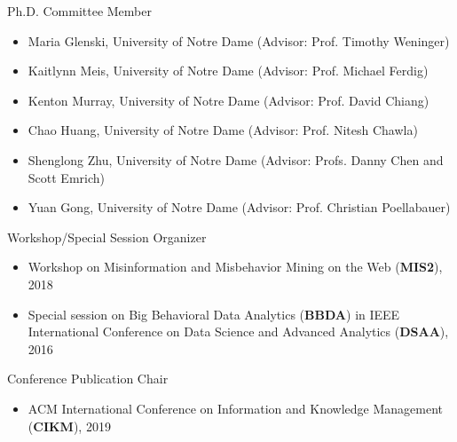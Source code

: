 \documentclass[margin, 9pt]{res}
\begin{document}
\begin{resume}
{Ph.D. Committee Member}
\begin{itemize}
\item Maria Glenski, University of Notre Dame (Advisor: Prof. Timothy Weninger)
\item Kaitlynn Meis, University of Notre Dame (Advisor: Prof. Michael Ferdig)
\item Kenton Murray, University of Notre Dame (Advisor: Prof. David Chiang)	
\item Chao Huang, University of Notre Dame (Advisor: Prof. Nitesh Chawla)
\item Shenglong Zhu, University of Notre Dame (Advisor: Profs. Danny Chen and Scott Emrich)
\item Yuan Gong, University of Notre Dame (Advisor: Prof. Christian Poellabauer)
\end{itemize}
\vspace{-0.1in}

{Workshop/Special Session Organizer}
\begin{itemize}
\item Workshop on Misinformation and Misbehavior Mining on the Web (\textbf{MIS2}), 2018
\item Special session on Big Behavioral Data Analytics (\textbf{BBDA})
	in IEEE International Conference on Data Science and Advanced Analytics (\textbf{DSAA}), 2016
\end{itemize}
\vspace{-0.1in}

{Conference Publication Chair}
\begin{itemize}
\item ACM International Conference on Information and Knowledge Management (\textbf{CIKM}), 2019
\end{itemize}
\vspace{-0.1in}


\end{resume}
\end{document}
